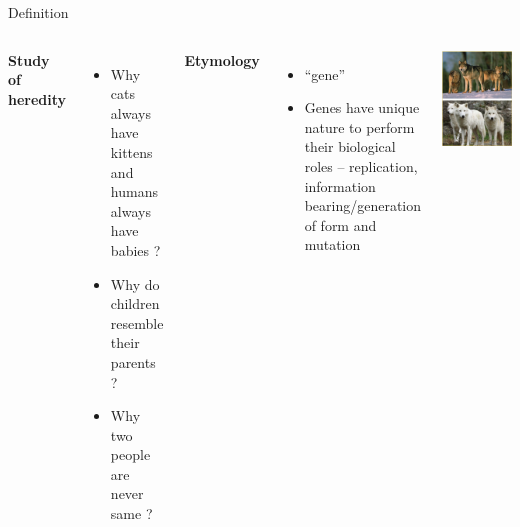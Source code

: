 \documentclass[11pt,ignorenonframetext,aspectratio=169]{beamer}
\providecommand{\tightlist}{%
  \setlength{\itemsep}{0pt}\setlength{\parskip}{0pt}}
\newcommand{\bcolumns}{\begin{columns}[T, onlytextwidth]}
\newcommand{\ecolumns}{\end{columns}}
\begin{document}
\begin{frame}{Definition}
\protect\hypertarget{definition}{}
\bcolumns
{}

\textbf{Study of heredity}

\begin{itemize}[<+->]
\tightlist
\item
  Why cats always have kittens and humans always have babies ?
\item
  Why do children resemble their parents ?
\item
  Why two people are never same ?
\end{itemize}

\textbf{Etymology}

\begin{itemize}[<+->]
\tightlist
\item
  ``gene''
\item
  Genes have unique nature to perform their biological roles --
  replication, information bearing/generation of form and mutation
\end{itemize}


\begin{center}\includegraphics[width=0.75\linewidth]{../images/like_begets_like} \end{center}

\ecolumns
\end{frame}
\end{document}
